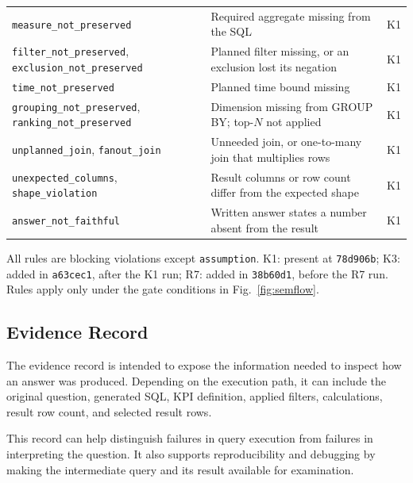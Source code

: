 \documentclass[conference]{IEEEtran}
\begin{document}
\begin{table}[!t]
\begin{tabular}{@{}>{\raggedright}p{}>{\raggedright}p{}>{\centering\arraybackslash}p{}@{}}
\texttt{measure\_\allowbreak{}not\_\allowbreak{}preserved} & Required aggregate missing from the SQL & K1 \\
\texttt{filter\_\allowbreak{}not\_\allowbreak{}preserved}, \texttt{exclusion\_\allowbreak{}not\_\allowbreak{}preserved} & Planned filter missing, or an exclusion lost its negation & K1 \\
\texttt{time\_\allowbreak{}not\_\allowbreak{}preserved} & Planned time bound missing & K1 \\
\texttt{grouping\_\allowbreak{}not\_\allowbreak{}preserved}, \texttt{ranking\_\allowbreak{}not\_\allowbreak{}preserved} & Dimension missing from GROUP BY; top-$N$ not applied & K1 \\
\texttt{unplanned\_\allowbreak{}join}, \texttt{fanout\_\allowbreak{}join} & Unneeded join, or one-to-many join that multiplies rows & K1 \\
\texttt{unexpected\_\allowbreak{}columns}, \texttt{shape\_\allowbreak{}violation} & Result columns or row count differ from the expected shape & K1 \\
\texttt{answer\_\allowbreak{}not\_\allowbreak{}faithful} & Written answer states a number absent from the result & K1 \\
\bottomrule
\end{tabular}

\vspace{3pt}
\parbox{\columnwidth}{\scriptsize All rules are blocking violations except \texttt{assumption}. K1: present at \texttt{78d906b}; K3: added in \texttt{a63cec1}, after the K1 run; R7: added in \texttt{38b60d1}, before the R7 run. Rules apply only under the gate conditions in Fig.~\ref{fig:semflow}.}
\end{table}

\subsection{Evidence Record}

The evidence record is intended to expose the information needed to inspect how an answer was produced. Depending on the execution path, it can include the original question, generated SQL, KPI definition, applied filters, calculations, result row count, and selected result rows.

This record can help distinguish failures in query execution from failures in interpreting the question. It also supports reproducibility and debugging by making the intermediate query and its result available for examination.
\end{document}
